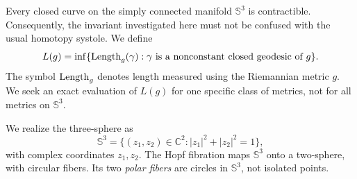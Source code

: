 \documentclass[11pt,a4paper]{article}
\theoremstyle{remark}\newtheorem{remark}[theorem]{Remark}
\newcommand{\Sthree}{\mathbb S^3}\newcommand{\R}{\mathbb R}\newcommand{\C}{\mathbb C}\newcommand{\Z}{\mathbb Z}
\begin{document}
Every closed curve on the simply connected manifold $\Sthree$ is contractible. Consequently, the invariant investigated here must not be confused with the usual homotopy systole. We define
\begin{equation}\label{eq:defL}
L(g)=\inf\{\operatorname{Length}_g(\gamma):\gamma\text{ is a nonconstant closed geodesic of }g\}.
\end{equation}
The symbol $\operatorname{Length}_g$ denotes length measured using the Riemannian metric $g$. We seek an exact evaluation of $L(g)$ for one specific class of metrics, not for all metrics on $\Sthree$.

We realize the three-sphere as
\[
\Sthree=\{(z_1,z_2)\in\C^2:|z_1|^2+|z_2|^2=1\},
\]
with complex coordinates $z_1,z_2$. The Hopf fibration maps $\Sthree$ onto a two-sphere, with circular fibers. Its two \emph{polar fibers} are circles in $\Sthree$, not isolated points.
\end{document}
